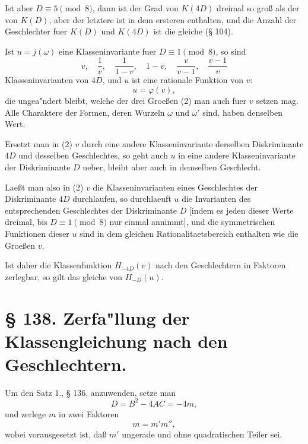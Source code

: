 \documentclass[12pt,a4paper]{article}
\theoremstyle{plain}
\theoremstyle{definition}
\theoremstyle{remark}
\begin{document}
Ist aber $D \equiv 5 \pmod{8}$, dann ist der Grad von $K(4D)$ dreimal so gro\ss{} als der von $K(D)$, aber der letztere ist in dem ersteren enthalten, und die Anzahl der Geschlechter fuer $K(D)$ und $K(4D)$ ist die gleiche (\S{} 104).

Ist $u = j(\omega)$ eine Klasseninvariante fuer $D \equiv 1 \pmod{8}$, so sind
\begin{equation}\label{eq:137_2}
v, \quad \frac{1}{v}, \quad \frac{1}{1-v}, \quad 1-v, \quad \frac{v}{v-1}, \quad \frac{v-1}{v}
\end{equation}
Klasseninvarianten von $4D$, und $u$ ist eine rationale Funktion von $v$:
\begin{equation}\label{eq:137_2b}
u = \varphi(v),
\end{equation}
die ungea"ndert bleibt, welche der drei Groe\ss{}en (2) man auch fuer $v$ setzen mag. Alle Charaktere der Formen, deren Wurzeln $\omega$ und $\omega'$ sind, haben denselben Wert.

Ersetzt man in (2) $v$ durch eine andere Klasseninvariante derselben Diskriminante $4D$ und desselben Geschlechtes, so geht auch $u$ in eine andere Klasseninvariante der Diskriminante $D$ ueber, bleibt aber auch in demselben Geschlecht.

Lae\ss{}t man also in (2) $v$ die Klasseninvarianten eines Geschlechtes der Diskriminante $4D$ durchlaufen, so durchlaeuft $u$ die Invarianten des entsprechenden Geschlechtes der Diskriminante $D$ [indem es jeden dieser Werte dreimal, bis $D \equiv 1 \pmod{8}$ nur einmal annimmt], und die symmetrischen Funktionen dieser $u$ sind in dem gleichen Rationalitaetsbereich enthalten wie die Groe\ss{}en $v$.

Ist daher die Klassenfunktion $H_{-4D}(v)$ nach den Geschlechtern in Faktoren zerlegbar, so gilt das gleiche von $H_{-D}(u)$.

\newpage

\section*{\S{} 138. Zerfa"llung der Klassengleichung nach den Geschlechtern.}

Um den Satz 1., \S{} 136, anzuwenden, setze man
\begin{equation}\label{eq:138_1}
D = B^2 - 4AC = -4m,
\end{equation}
und zerlege $m$ in zwei Faktoren
\begin{equation}\label{eq:138_2}
m = m'm'',
\end{equation}
wobei vorausgesetzt ist, da\ss{} $m'$ ungerade und ohne quadratischen Teiler sei.
\end{document}
